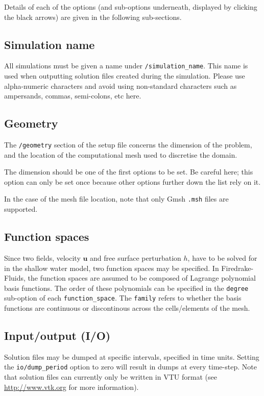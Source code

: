 \documentclass[a4paper,11pt]{report}
\begin{document}
Details of each of the options (and sub-options underneath, displayed by clicking the black arrows) are given in the following sub-sections.

\subsection{Simulation name}
All simulations must be given a name under \texttt{/simulation\_name}. This name is used when outputting solution files created during the simulation. Please use alpha-numeric characters and avoid using non-standard characters such as ampersands, commas, semi-colons, etc here.

\subsection{Geometry}
The \texttt{/geometry} section of the setup file concerns the dimension of the problem, and the location of the computational mesh used to discretise the domain.

The dimension should be one of the first options to be set. Be careful here; this option can only be set once because other options further down the list rely on it.

In the case of the mesh file location, note that only Gmsh \texttt{.msh} files \citep{GeuzaineRemacle_2009} are supported.

\subsection{Function spaces}
Since two fields, velocity $\mathbf{u}$ and free surface perturbation $h$, have to be solved for in the shallow water model, two function spaces may be specified. In Firedrake-Fluids, the function spaces are assumed to be composed of Lagrange polynomial basis functions. The order of these polynomials can be specified in the \texttt{degree} sub-option of each \texttt{function\_space}. The \texttt{family} refers to whether the basis functions are continuous or discontinous across the cells/elements of the mesh.

\subsection{Input/output (I/O)}
Solution files may be dumped at specific intervals, specified in time units. Setting the \texttt{io/dump\_period} option to zero will result in dumps at every time-step. Note that solution files can currently only be written in VTU format (see \url{http://www.vtk.org} for more information).
\end{document}
